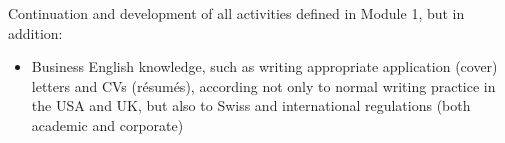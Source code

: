 Continuation and development of all activities defined in Module 1, but in addition:
\begin{itemize}
    \item Business English knowledge, such as writing appropriate application (cover) letters and CVs (résumés), according not only to normal writing practice in the USA and UK, but also to Swiss and international regulations (both academic and corporate)
\end{itemize}